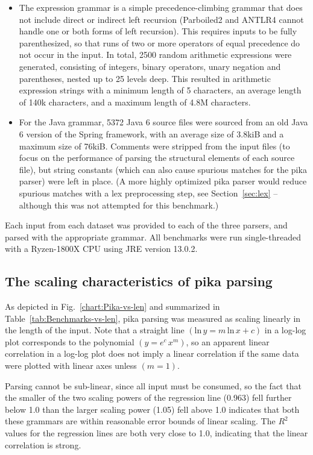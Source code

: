 \documentclass[manuscript,screen]{acmart}
\begin{document}
\begin{itemize}
    \item The expression grammar is a simple precedence-climbing grammar that does not include direct or indirect left recursion (Parboiled2 and ANTLR4 cannot handle one or both forms of left recursion). This requires inputs to be fully parenthesized, so that runs of two or more operators of equal precedence do not occur in the input. In total, 2500 random arithmetic expressions were generated, consisting of integers, binary operators, unary negation and parentheses, nested up to 25 levels deep. This resulted in arithmetic expression strings with a minimum length of 5 characters, an average length of 140k characters, and a maximum length of 4.8M characters.
    \item For the Java grammar, 5372 Java 6 source files were sourced from an old Java 6 version of the Spring framework, with an average size of 3.8kiB and a maximum size of 76kiB. Comments were stripped from the input files (to focus on the performance of parsing the structural elements of each source file), but string constants (which can also cause spurious matches for the pika parser) were left in place. (A more highly optimized pika parser would reduce spurious matches with a lex preprocessing step, see Section~\ref{sec:lex} -- although this was not attempted for this benchmark.)
\end{itemize}

Each input from each dataset was provided to each of the three parsers, and parsed with the appropriate grammar. All benchmarks were run single-threaded with a Ryzen-1800X CPU using JRE version 13.0.2.

\subsection{The scaling characteristics of pika parsing}

As depicted in Fig.~\ref{chart:Pika-vs-len} and summarized in Table~\ref{tab:Benchmarks-vs-len}, pika parsing was measured as scaling linearly in the length of the input. Note that a straight line $(\mathrm{ln} \, y = m \, \mathrm{ln} \, x + c)$ in a log-log plot corresponds to the polynomial $(y = e^c \, x^m)$, so an apparent linear correlation in a log-log plot does not imply a linear correlation if the same data were plotted with linear axes unless $(m = 1)$.

Parsing cannot be sub-linear, since all input must be consumed, so the fact that the smaller of the two scaling powers of the regression line (0.963) fell further below 1.0 than the larger scaling power (1.05) fell above 1.0 indicates that both these grammars are within reasonable error bounds of linear scaling. The $R^2$ values for the regression lines are both very close to 1.0, indicating that the linear correlation is strong.
\end{document}
